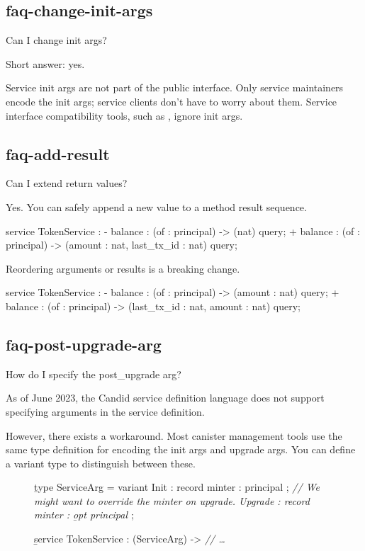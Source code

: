 \documentclass{article}
\begin{document}
\subsection{faq-change-init-args}{Can I change init args?}

Short answer: yes.

Service init args are not part of the public interface.
Only service maintainers encode the init args; service clients don't have to worry about them.
Service interface compatibility tools, such as \href{https://github.com/dfinity/candid/blob/e212e096cb726548c6d6edba1189375dc5ad364e/tools/didc/README.md}{}, ignore init args.

\subsection{faq-add-result}{Can I extend return values?}

Yes.
You can safely append a new value to a method result sequence.

\begin{code}[good]
 service TokenService : {
-  balance : (of : principal) -> (nat) query;
+  balance : (of : principal) -> (amount : nat, last_tx_id : nat) query;
 }
\end{code}

Reordering arguments or results is a breaking change.

\begin{code}[bad]
 service TokenService : {
-  balance : (of : principal) -> (amount : nat) query;
+  balance : (of : principal) -> (last_tx_id : nat, amount : nat) query;
 }
\end{code}

\subsection{faq-post-upgrade-arg}{How do I specify the post_upgrade arg?}

As of June 2023, the Candid service definition language does not support specifying  arguments in the service definition.

However, there exists a workaround.
Most canister management tools use the same type definition for encoding the init args and upgrade args.
You can define a variant type to distinguish between these.

\begin{figure}

\begin{code}[candid]
\b{type} ServiceArg = variant {
  Init    : record { minter : principal };
  \em{// We might want to override the minter on upgrade.}
  Upgrade : record { minter : \b{opt} principal }
};

\b{service} TokenService : (ServiceArg) -> {
  \em{// \ldots}
}
\end{code}
\end{figure}
\end{document}
